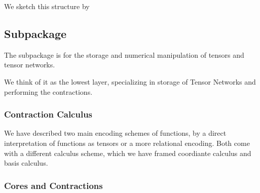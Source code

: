 We sketch this structure by
\begin{center}
\end{center}



\subsection{Subpackage \spengine}

The \spengine subpackage is for the storage and numerical manipulation of tensors and tensor networks.

We think of it as the lowest layer, specializing in storage of Tensor Networks and performing the contractions.

\subsubsection{Contraction Calculus} %

We have described two main encoding schemes of functions, by a direct interpretation of functions as tensors or a more relational encoding.
Both come with a different calculus scheme, which we have framed coordiante calculus and basis calculus.



\subsubsection{Cores and Contractions}

